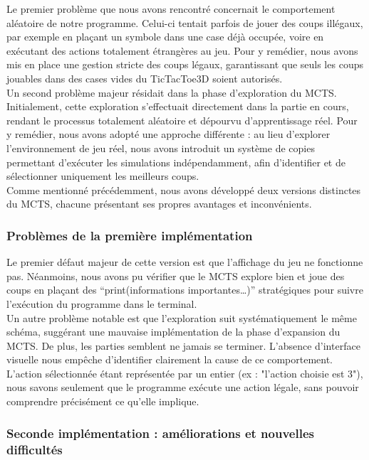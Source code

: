 \documentclass{article}
\begin{document}
\quad Le premier problème que nous avons rencontré concernait le comportement aléatoire de notre programme. Celui-ci tentait parfois de jouer des coups illégaux, par exemple en plaçant un symbole dans une case déjà occupée, voire en exécutant des actions totalement étrangères au jeu. Pour y remédier, nous avons mis en place une gestion stricte des coups légaux, garantissant que seuls les coups jouables dans des cases vides du TicTacToe3D soient autorisés.\\

Un second problème majeur résidait dans la phase d’exploration du MCTS. Initialement, cette exploration s’effectuait directement dans la partie en cours, rendant le processus totalement aléatoire et dépourvu d’apprentissage réel. Pour y remédier, nous avons adopté une approche différente : au lieu d’explorer l’environnement de jeu réel, nous avons introduit un système de copies permettant d’exécuter les simulations indépendamment, afin d’identifier et de sélectionner uniquement les meilleurs coups.\\

Comme mentionné précédemment, nous avons développé deux versions distinctes du MCTS, chacune présentant ses propres avantages et inconvénients.

    \subsubsection{Problèmes de la première implémentation}
    
    \quad Le premier défaut majeur de cette version est que l'affichage du jeu ne fonctionne pas. Néanmoins, nous avons pu vérifier que le MCTS explore bien et joue des coups en plaçant des “print(informations importantes…)” stratégiques pour suivre l'exécution du programme dans le terminal.\\
    
    Un autre problème notable est que l’exploration suit systématiquement le même schéma, suggérant une mauvaise implémentation de la phase d’expansion du MCTS. De plus, les parties semblent ne jamais se terminer. L’absence d’interface visuelle nous empêche d’identifier clairement la cause de ce comportement. L'action sélectionnée étant représentée par un entier (ex : "l’action choisie est 3"), nous savons seulement que le programme exécute une action légale, sans pouvoir comprendre précisément ce qu’elle implique.

    \subsubsection{Seconde implémentation : améliorations et nouvelles difficultés}
    
\end{document}
